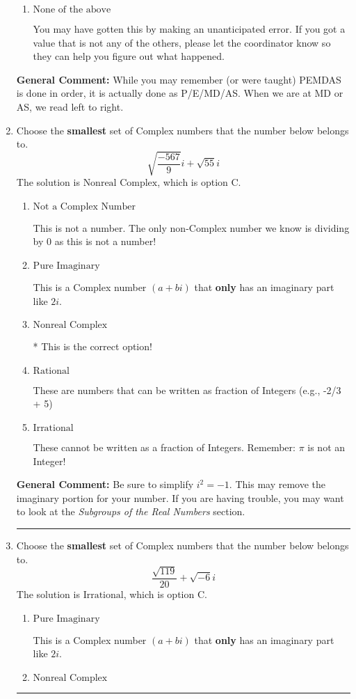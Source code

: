 \documentclass{extbook}[14pt]
\newcommand{\litem}[1]{\item #1

\rule{\textwidth}{0.4pt}}
\begin{document}
\begin{enumerate}
{\begin{enumerate}[label=\Alph*.]
 221.962, which corresponds to not distributing addition and subtraction correctly.
\item \( \text{None of the above} \)

 You may have gotten this by making an unanticipated error. If you got a value that is not any of the others, please let the coordinator know so they can help you figure out what happened.
\end{enumerate}

\textbf{General Comment:} While you may remember (or were taught) PEMDAS is done in order, it is actually done as P/E/MD/AS. When we are at MD or AS, we read left to right.
}
\litem{
Choose the \textbf{smallest} set of Complex numbers that the number below belongs to.
\[ \sqrt{\frac{-567}{9}} i+\sqrt{55}i \]The solution is \( \text{Nonreal Complex} \), which is option C.\begin{enumerate}[label=\Alph*.]
\item \( \text{Not a Complex Number} \)

This is not a number. The only non-Complex number we know is dividing by 0 as this is not a number!
\item \( \text{Pure Imaginary} \)

This is a Complex number $(a+bi)$ that \textbf{only} has an imaginary part like $2i$.
\item \( \text{Nonreal Complex} \)

* This is the correct option!
\item \( \text{Rational} \)

These are numbers that can be written as fraction of Integers (e.g., -2/3 + 5)
\item \( \text{Irrational} \)

These cannot be written as a fraction of Integers. Remember: $\pi$ is not an Integer!
\end{enumerate}

\textbf{General Comment:} Be sure to simplify $i^2 = -1$. This may remove the imaginary portion for your number. If you are having trouble, you may want to look at the \textit{Subgroups of the Real Numbers} section.
}
\litem{
Choose the \textbf{smallest} set of Complex numbers that the number below belongs to.
\[ \frac{\sqrt{119}}{20}+\sqrt{-6}i \]The solution is \( \text{Irrational} \), which is option C.\begin{enumerate}[label=\Alph*.]
\item \( \text{Pure Imaginary} \)

This is a Complex number $(a+bi)$ that \textbf{only} has an imaginary part like $2i$.
\item \( \text{Nonreal Complex} \)


\end{enumerate}}
\end{enumerate}
\end{document}
